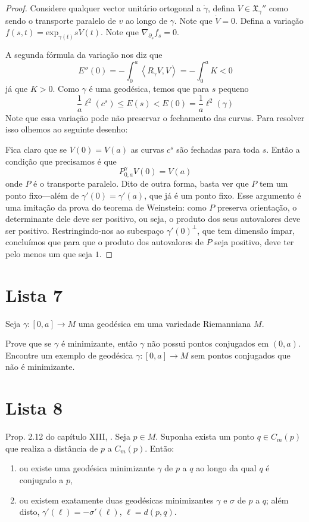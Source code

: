 \documentclass{book}
\begin{document}
\begin{proof}
Considere qualquer vector unitário ortogonal
a $\dot \gamma$, defina $V\in
\mathfrak{X}_{\gamma}''$ como sendo o
transporte paralelo de $v$ ao longo de
$\gamma$. Note que $\dot V=0$. Defina a
variação
$f(s,t)=\text{exp}_{\gamma(t)}sV(t)$. Note
que
$\nabla_{\partial_s}f_s=0$.

A segunda fórmula da variação nos diz que
\[E''(0)=-\int_0^a \left\langle{}R_{\dot
\gamma}V,V\right\rangle{}=-\int_0^a K<0\] já que
$K>0$. Como $\gamma$ é uma geodésica,
temos que para $s$ pequeno
\[\frac{1}{a}\ell^2(c^s)\leq E(s) < E(0)=
\frac{1}{a}\ell^2(\gamma)\] Note que essa
variação pode não preservar o
fechamento das curvas. Para resolver isso
olhemos ao seguinte desenho:

Fica claro que se $V(0)=V(a)$ as curvas $c^s$
são fechadas para toda $s$. Então
a condição que precisamos é que
\[P^\gamma_{0,a}V(0)=V(a)\] onde $P$ é o
transporte paralelo. Dito de outra forma,
basta ver que $P$ tem um ponto
fixo---além de $\gamma'(0)=\gamma'(a)$, que
já é um ponto fixo. Esse argumento é
uma imitação da prova do teorema de
Weinstein: como $P$ preserva orientação, o
determinante dele deve ser positivo, ou seja,
o produto dos seus autovalores
deve ser positivo. Restringindo-nos ao
subespaço $\gamma'(0)^\perp$, que tem
dimensão ímpar, concluímos que para que o
produto dos autovalores de $P$ seja
positivo, deve ter pelo menos um que seja
$1$.
\end{proof}

\section{Lista 7}
\label{section-lista-7}

\begin{exercise}
\label{exercise-minim-impli-no-conju-point}
Seja $\gamma:[0,a]\to M$ uma geodésica em uma
variedade Riemanniana $M$.

 Prove que se $\gamma$ é minimizante, então
 $\gamma$ não possui pontos
 conjugados em  $(0,a)$. Encontre um exemplo
 de geodésica $\gamma:[0,a] \to M$
sem pontos conjugados que não é minimizante.
\end{exercise}

\section{Lista 8}
\label{section-lista-8}

\begin{exercise}
\label{exercise-l8-1}
Prop. 2.12 do capítulo XIII, \cite{doc}. Seja
$p \in M$.
Suponha exista um ponto $q \in C_m(p)$ que
realiza a distância de $p$ a
$C_m(p)$. Então:
\begin{enumerate}
\item ou existe uma geodésica
minimizante $\gamma$ de $p$ a $q$ ao longo da
qual $q$ é
conjugado a $p$,
\item ou existem exatamente duas geodésicas
minimizantes $\gamma$ e $\sigma$ de $p$ a
$q$; além disto,
$\gamma'(\ell)=-\sigma'(\ell)$,
$\ell=d(p,q)$.
\end{enumerate}
\end{exercise}
\end{document}
